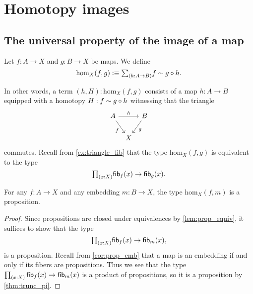 \chapter{Homotopy images}

\section{The universal property of the image of a map}

\begin{defn}
Let $f:A\to X$ and $g:B\to X$ be maps. We define
\begin{equation*}
\mathrm{hom}_X(f,g)\defeq\sm{h:A\to B}f\htpy g\circ h.
\end{equation*}
\end{defn}

\begin{rmk}
In other words, a term $(h,H):\mathrm{hom}_X(f,g)$ consists of a map $h:A\to B$ equipped with a homotopy $H:f\sim g\circ h$ witnessing that the triangle
\begin{equation*}
\begin{tikzcd}[column sep=tiny]
A \arrow[rr,"h"] \arrow[dr,swap,"f"] & & B \arrow[dl,"g"] \\
& X
\end{tikzcd}
\end{equation*}
commutes. Recall from \cref{ex:triangle_fib} that the type $\mathrm{hom}_X(f,g)$ is equivalent to the type
\begin{equation*}
\prd{x:X}\fib{f}{x}\to\fib{g}{x}.
\end{equation*}
\end{rmk}

\begin{lem}
For any $f:A\to X$ and any embedding $m:B\to X$, the type $\mathrm{hom}_X(f,m)$ is a proposition.
\end{lem}

\begin{proof}
Since propositions are closed under equivalences by \cref{lem:prop_equiv}, it suffices to show that the type
\begin{equation*}
\prd{x:X}\fib{f}{x}\to\fib{m}{x},
\end{equation*}
is a proposition. Recall from \cref{cor:prop_emb} that a map is an embedding if and only if its fibers are propositions.
Thus we see that the type $\prd{x:X}\fib{f}{x}\to\fib{m}{x}$ is a product of propositions, so it is a proposition by \cref{thm:trunc_pi}.
\end{proof}


